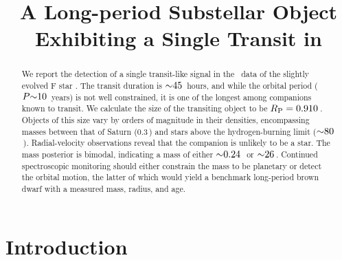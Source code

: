 \documentclass[twocolumn]{aastex63}
\begin{document}
\title{A Long-period Substellar Object Exhibiting a Single Transit in \kep}




\begin{abstract}

We report the detection of a single transit-like signal in the \kep\ data of the slightly evolved F star \thisstar. The transit duration is $\mathord{\sim}45$\ hours, and while the orbital period ($P\mathord{\sim}10$\ years) is not well constrained, it is one of the longest among companions known to transit. We calculate the size of the transiting object to be $\rp = 0.910$\,\rjup. Objects of this size vary by orders of magnitude in their densities, encompassing masses between that of Saturn ($0.3$\,\mjup) and stars above the hydrogen-burning limit ($\mathord{\sim}80$\,\mjup).  Radial-velocity observations reveal that the companion is unlikely to be a star. The mass posterior is bimodal, indicating a mass of either $\mathord{\sim}0.24$\,\mjup\ or $\mathord{\sim}26$\,\mjup. Continued spectroscopic monitoring should either constrain the mass to be planetary or detect the orbital motion, the latter of which would yield a benchmark long-period brown dwarf with a measured mass, radius, and age. \\

\end{abstract}

\section{Introduction} 
\end{document}
